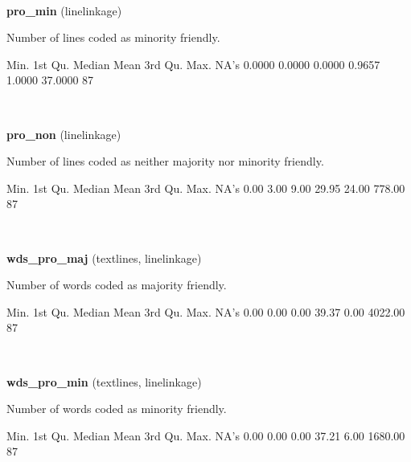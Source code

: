 \documentclass[]{article}
\newenvironment{Shaded}{\begin{snugshade}}{\end{snugshade}}
\newcommand{\StringTok}[1]{\textcolor[rgb]{0.31,0.60,0.02}{{#1}}}
\newcommand{\NormalTok}[1]{{#1}}
\begin{document}
~

\vspace{1em}

\textbf{pro\_min} (linelinkage)

Number of lines coded as minority friendly.

\begin{Shaded}
\begin{Highlighting}[]
   \NormalTok{Min. 1st Qu.  Median    Mean 3rd Qu.    Max.    NA}\StringTok{'s }
\StringTok{ 0.0000  0.0000  0.0000  0.9657  1.0000 37.0000      87 }
\end{Highlighting}
\end{Shaded}

~

\vspace{1em}

\textbf{pro\_non} (linelinkage)

Number of lines coded as neither majority nor minority friendly.

\begin{Shaded}
\begin{Highlighting}[]
   \NormalTok{Min. 1st Qu.  Median    Mean 3rd Qu.    Max.    NA}\StringTok{'s }
\StringTok{   0.00    3.00    9.00   29.95   24.00  778.00      87 }
\end{Highlighting}
\end{Shaded}

~

\vspace{1em}

\textbf{wds\_pro\_maj} (textlines, linelinkage)

Number of words coded as majority friendly.

\begin{Shaded}
\begin{Highlighting}[]
   \NormalTok{Min. 1st Qu.  Median    Mean 3rd Qu.    Max.    NA}\StringTok{'s }
\StringTok{   0.00    0.00    0.00   39.37    0.00 4022.00      87 }
\end{Highlighting}
\end{Shaded}

~

\vspace{1em}

\textbf{wds\_pro\_min} (textlines, linelinkage)

Number of words coded as minority friendly.

\begin{Shaded}
\begin{Highlighting}[]
   \NormalTok{Min. 1st Qu.  Median    Mean 3rd Qu.    Max.    NA}\StringTok{'s }
\StringTok{   0.00    0.00    0.00   37.21    6.00 1680.00      87 }
\end{Highlighting}
\end{Shaded}
\end{document}
